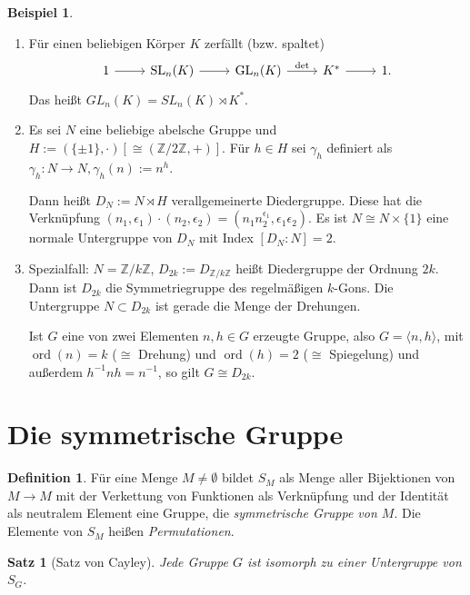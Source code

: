 \documentclass[12pt]{scrartcl} %
\DeclareMathOperator{\GL}{GL}
\DeclareMathOperator{\SL}{SL}
\DeclareMathOperator{\ord}{ord}
\newtheorem{thm}{Satz}[section]
\theoremstyle{definition}
\newtheorem*{defn}{Definition}
\newtheorem{ex}{Beispiel}
\theoremstyle{remark}
\begin{document}
\begin{ex}
\label{ex:semidirekt}

\begin{enumerate}[label=(\alph*)]
	\item Für einen beliebigen Körper $K$ zerfällt (bzw. spaltet)
		\[ \begin{tikzcd}
			 1 \arrow[r] & \SL_n(K) \arrow[r] & \GL_n(K) \arrow[r,"\det"] & K^* \arrow[r] & 1.
		\end{tikzcd} \]
		Das heißt $GL_n(K) = SL_n(K)\rtimes K^*$.
	\item Es sei $N$ eine beliebige abelsche Gruppe und $H := (\{\pm 1\},\cdot)\left[\cong(\mathbb{Z}/2\mathbb{Z},+)\right]$. Für $h\in H$ sei $\gamma_h$ definiert als $\gamma_h:N\to N, \gamma_h(n) := n^h$.

		Dann heißt $D_N := N \rtimes H$ verallgemeinerte Diedergruppe. Diese hat die Verknüpfung
		$(n_1,\epsilon_1)\cdot(n_2,\epsilon_2) = (n_1 n_2^{\epsilon_1},\epsilon_1\epsilon_2)$.
		Es ist $N \cong N\times\{1\}$ eine normale Untergruppe von $D_N$ mit Index $[D_N:N] = 2$.

	\item Spezialfall: $N = \mathbb{Z}/k\mathbb{Z}$, $D_{2k} := D_{\mathbb{Z}/k\mathbb{Z}}$ heißt Diedergruppe der Ordnung $2k$.
		Dann ist $D_{2k}$ die Symmetriegruppe des regelmäßigen \(k\)-Gons.
		Die Untergruppe $N\subset D_{2k}$ ist gerade die Menge der Drehungen.

		Ist $G$ eine von zwei Elementen $n,h\in G$ erzeugte Gruppe, also $G = \langle n, h\rangle$, mit $\ord(n) = k$ ($\cong$ Drehung) und $\ord(h) = 2$ ($\cong$ Spiegelung) und außerdem $h^{-1}nh=n^{-1}$, so gilt $G\cong D_{2k}$.
\end{enumerate}

\end{ex}

\section{Die symmetrische Gruppe}

\begin{defn}
	Für eine Menge $M\neq\emptyset$ bildet $S_M$ als Menge aller Bijektionen von $M\to M$ mit der Verkettung von Funktionen als Verknüpfung und der Identität als neutralem Element eine Gruppe, die \emph{symmetrische Gruppe von $M$}.
	Die Elemente von $S_M$ heißen \emph{Permutationen}.
\end{defn}

\begin{thm}[Satz von Cayley]
	Jede Gruppe $G$ ist isomorph zu einer Untergruppe von $S_G$.
\end{thm}
\end{document}
